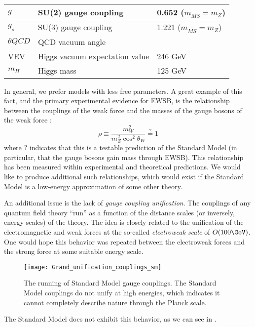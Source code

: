 \begin{table}
\begin{tabular}{| l | l | l |}
$g$               & SU(2) gauge coupling           & 0.652     ($m_{\bar{MS}} = m_Z$)                         \\ \hline
$g_s$             & SU(3) gauge coupling           & 1.221     ($m_{\bar{MS}} = m_Z$)                         \\ \hline
$\theta{QCD}$     & QCD vacuum angle               & \order 0                          \\ \hline
VEV               & Higgs vacuum expectation value & 246 GeV                           \\ \hline
$m_H$             & Higgs mass                     & 125 GeV                           \\ \hline
\end{tabular}
\end{table}
In general, we prefer models with less free parameters.
A great example of this fact, and the primary experimental evidence for EWSB, is the relationship between the couplings of the weak force and the masses of the gauge bosons of the weak force :
\begin{equation}
\rho \equiv \frac{m_W^2}{m_Z^2 \cos^2 \theta_W } \stackrel{?}{=} 1
\end{equation}
where $?$ indicates that this is a testable prediction of the Standard Model (in particular, that the gauge bosons gain mass through EWSB).
This relationship has been measured  within experimental and theoretical predictions.
We would like to produce additional such relationships, which would exist if the Standard Model is a low-energy approximation of some other theory.

An additional issue is the lack of \textit{gauge coupling unification}.
The couplings of any quantum field theory ``run'' as a function of the distance scales (or inversely, energy scales) of the theory.
The idea is closely related to the unification of the electromagnetic and weak forces at the so-called \textit{electroweak scale} of $O(100 \GeV)$.
One would hope this behavior was repeated between the electroweak forces and the strong force at some suitable energy scale.
\begin{figure}
\caption{The running of Standard Model gauge couplings.  The Standard Model couplings do not unify at high energies, which indicates it cannot completely describe nature through the Planck scale.} \label{fig:sm_gauge_coupling}
\texttt{[image: Grand\_unification\_couplings\_sm]}
\end{figure}
The Standard Model does not exhibit this behavior, as we can see in .

